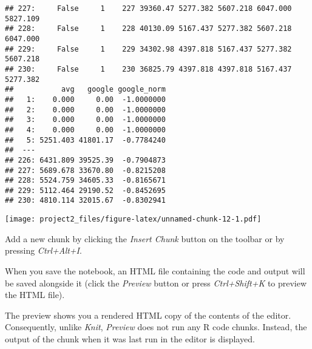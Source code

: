 \documentclass[
]{article}
\newenvironment{Shaded}{\begin{snugshade}}{\end{snugshade}}
\newcommand{\CommentTok}[1]{\textcolor[rgb]{0.56,0.35,0.01}{\textit{#1}}}
\newcommand{\DataTypeTok}[1]{\textcolor[rgb]{0.13,0.29,0.53}{#1}}
\newcommand{\KeywordTok}[1]{\textcolor[rgb]{0.13,0.29,0.53}{\textbf{#1}}}
\newcommand{\NormalTok}[1]{#1}
\newcommand{\OperatorTok}[1]{\textcolor[rgb]{0.81,0.36,0.00}{\textbf{#1}}}
\newcommand{\StringTok}[1]{\textcolor[rgb]{0.31,0.60,0.02}{#1}}
\begin{document}
\begin{verbatim}
## 227:     False     1    227 39360.47 5277.382 5607.218 6047.000 5827.109
## 228:     False     1    228 40130.09 5167.437 5277.382 5607.218 6047.000
## 229:     False     1    229 34302.98 4397.818 5167.437 5277.382 5607.218
## 230:     False     1    230 36825.79 4397.818 4397.818 5167.437 5277.382
##           avg   google google_norm
##   1:    0.000     0.00  -1.0000000
##   2:    0.000     0.00  -1.0000000
##   3:    0.000     0.00  -1.0000000
##   4:    0.000     0.00  -1.0000000
##   5: 5251.403 41801.17  -0.7784240
##  ---                              
## 226: 6431.809 39525.39  -0.7904873
## 227: 5689.678 33670.80  -0.8215208
## 228: 5524.759 34605.33  -0.8165671
## 229: 5112.464 29190.52  -0.8452695
## 230: 4810.114 32015.67  -0.8302941
\end{verbatim}

\begin{Shaded}
\end{Shaded}

\texttt{[image: project2\_files/figure-latex/unnamed-chunk-12-1.pdf]}

\begin{Shaded}
\end{Shaded}

Add a new chunk by clicking the \emph{Insert Chunk} button on the
toolbar or by pressing \emph{Ctrl+Alt+I}.

When you save the notebook, an HTML file containing the code and output
will be saved alongside it (click the \emph{Preview} button or press
\emph{Ctrl+Shift+K} to preview the HTML file).

The preview shows you a rendered HTML copy of the contents of the
editor. Consequently, unlike \emph{Knit}, \emph{Preview} does not run
any R code chunks. Instead, the output of the chunk when it was last run
in the editor is displayed.
\end{document}
